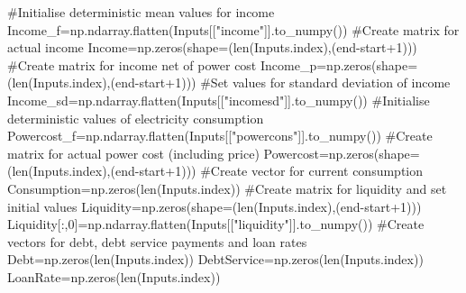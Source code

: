 \documentclass[
  letterpaper,
  DIV=11,
  numbers=noendperiod]{scrartcl}
\newenvironment{Shaded}{\begin{snugshade}}{\end{snugshade}}
\newcommand{\BuiltInTok}[1]{\textcolor[rgb]{0.00,0.23,0.31}{#1}}
\newcommand{\CommentTok}[1]{\textcolor[rgb]{0.37,0.37,0.37}{#1}}
\newcommand{\DecValTok}[1]{\textcolor[rgb]{0.68,0.00,0.00}{#1}}
\newcommand{\NormalTok}[1]{\textcolor[rgb]{0.00,0.23,0.31}{#1}}
\newcommand{\OperatorTok}[1]{\textcolor[rgb]{0.37,0.37,0.37}{#1}}
\newcommand{\StringTok}[1]{\textcolor[rgb]{0.13,0.47,0.30}{#1}}
\begin{document}
\begin{Shaded}
\begin{Highlighting}[]
    \CommentTok{\#Initialise deterministic mean values for income}
\NormalTok{    Income\_f}\OperatorTok{=}\NormalTok{np.ndarray.flatten(Inputs[[}\StringTok{"income"}\NormalTok{]].to\_numpy())}
    \CommentTok{\#Create matrix for actual income}
\NormalTok{    Income}\OperatorTok{=}\NormalTok{np.zeros(shape}\OperatorTok{=}\NormalTok{(}\BuiltInTok{len}\NormalTok{(Inputs.index),(end}\OperatorTok{{-}}\NormalTok{start}\OperatorTok{+}\DecValTok{1}\NormalTok{)))}
    \CommentTok{\#Create matrix for income net of power cost}
\NormalTok{    Income\_p}\OperatorTok{=}\NormalTok{np.zeros(shape}\OperatorTok{=}\NormalTok{(}\BuiltInTok{len}\NormalTok{(Inputs.index),(end}\OperatorTok{{-}}\NormalTok{start}\OperatorTok{+}\DecValTok{1}\NormalTok{)))}
    \CommentTok{\#Set values for standard deviation of income}
\NormalTok{    Income\_sd}\OperatorTok{=}\NormalTok{np.ndarray.flatten(Inputs[[}\StringTok{"incomesd"}\NormalTok{]].to\_numpy())}
    \CommentTok{\#Initialise deterministic values of electricity consumption}
\NormalTok{    Powercost\_f}\OperatorTok{=}\NormalTok{np.ndarray.flatten(Inputs[[}\StringTok{"powercons"}\NormalTok{]].to\_numpy())}
    \CommentTok{\#Create matrix for actual power cost (including price)}
\NormalTok{    Powercost}\OperatorTok{=}\NormalTok{np.zeros(shape}\OperatorTok{=}\NormalTok{(}\BuiltInTok{len}\NormalTok{(Inputs.index),(end}\OperatorTok{{-}}\NormalTok{start}\OperatorTok{+}\DecValTok{1}\NormalTok{)))}
    \CommentTok{\#Create vector for current consumption}
\NormalTok{    Consumption}\OperatorTok{=}\NormalTok{np.zeros(}\BuiltInTok{len}\NormalTok{(Inputs.index))}
    \CommentTok{\#Create matrix for liquidity and set initial values}
\NormalTok{    Liquidity}\OperatorTok{=}\NormalTok{np.zeros(shape}\OperatorTok{=}\NormalTok{(}\BuiltInTok{len}\NormalTok{(Inputs.index),(end}\OperatorTok{{-}}\NormalTok{start}\OperatorTok{+}\DecValTok{1}\NormalTok{)))}
\NormalTok{    Liquidity[:,}\DecValTok{0}\NormalTok{]}\OperatorTok{=}\NormalTok{np.ndarray.flatten(Inputs[[}\StringTok{"liquidity"}\NormalTok{]].to\_numpy())}
    \CommentTok{\#Create vectors for debt, debt service payments and loan rates}
\NormalTok{    Debt}\OperatorTok{=}\NormalTok{np.zeros(}\BuiltInTok{len}\NormalTok{(Inputs.index))}
\NormalTok{    DebtService}\OperatorTok{=}\NormalTok{np.zeros(}\BuiltInTok{len}\NormalTok{(Inputs.index))}
\NormalTok{    LoanRate}\OperatorTok{=}\NormalTok{np.zeros(}\BuiltInTok{len}\NormalTok{(Inputs.index))}


\end{Highlighting}
\end{Shaded}
\end{document}
